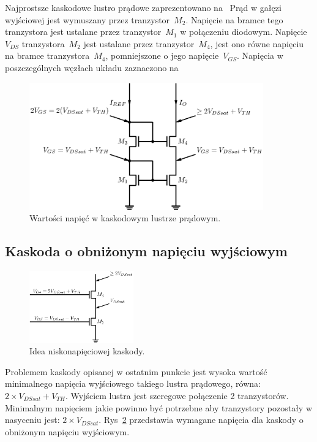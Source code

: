 \documentclass[twoside,pl,final]{labman}
\begin{document}
Najprostsze kaskodowe lustro prądowe zaprezentowano na~
Prąd w gałęzi wyjściowej jest wymuszany przez tranzystor~$M_2$.
Napięcie na bramce tego tranzystora jest ustalane
przez tranzystor~$M_1$ w połączeniu diodowym.
Napięcie~$V_{DS}$ tranzystora~$M_2$ jest ustalane przez tranzystor~$M_4$,
jest ono równe napięciu na bramce tranzystora~$M_4$,
pomniejszone o jego napięcie~$V_{GS}$.
Napięcia w poszczególnych węzłach układu
zaznaczono na~

\begin{figure}[!htbp]
  \centering
  \includegraphics[width=0.9\textwidth]{cascode_simple_node}
  \caption{Wartości napięć w kaskodowym lustrze prądowym.}
  \label{fig:cascode:simple:node}
\end{figure}

\subsection{Kaskoda o obniżonym napięciu wyjściowym}
\label{cascode:wideswing}

\begin{figure}[!htbp]
  \centering
  \includegraphics[width=0.4\textwidth]{cascode_wideswing}
  \caption{Idea niskonapięciowej kaskody.}
  \label{fig:cascode:wideswing:idea}
\end{figure}

Problemem kaskody opisanej w ostatnim punkcie jest wysoka wartość minimalnego
napięcia wyjściowego takiego lustra prądowego,
równa: $2 \times V_{DSsat} + V_{TH}$.
Wyjściem lustra jest szeregowe połączenie 2 tranzystorów.
Minimalnym napięciem jakie powinno być potrzebne
aby tranzystory pozostały w nasyceniu jest: $2 \times V_{DSsat}$.
Rys~\ref{fig:cascode:wideswing:idea} przedstawia
wymagane napięcia dla kaskody o obniżonym napięciu wyjściowym.
\end{document}
